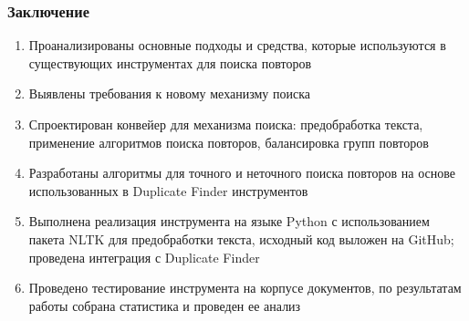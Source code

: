 \documentclass[aspectratio=169]{beamer}
\begin{document}

\begin{frame}\frametitle{Заключение}
	
	\begin{enumerate}
		\item Проанализированы основные подходы и средства, которые используются в существующих инструментах для поиска повторов
		\item Выявлены требования к новому механизму поиска
		\item Спроектирован конвейер для механизма поиска: предобработка текста, применение алгоритмов поиска повторов, балансировка групп повторов
		\item Разработаны алгоритмы для точного и неточного поиска повторов на основе использованных в Duplicate Finder инструментов
		\item Выполнена реализация инструмента на языке Python с использованием пакета NLTK для предобработки текста, исходный код выложен на GitHub; проведена интеграция с Duplicate Finder
		\item Проведено тестирование инструмента на корпусе документов, по результатам работы собрана статистика и проведен ее анализ
	\end{enumerate}

\end{frame}

\end{document}
